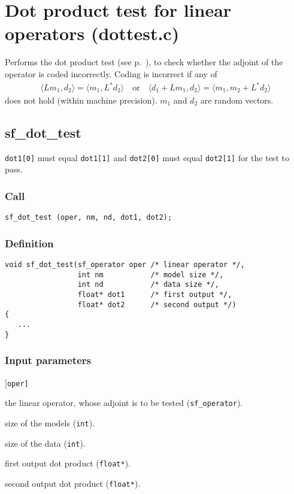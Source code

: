 \section{Dot product test for linear operators (dottest.c)}
Performs the dot product test (see p.~\pageref{sec:dot-product test}), to check whether the adjoint of the operator is coded incorrectly. Coding is incorrect if any of 
\begin{gather*}
   \langle Lm_1,d_2\rangle = \langle m_1, L^*d_2\rangle\quad\textrm{or}\quad
   \langle d_1 + Lm_1,d_2\rangle = \langle m_1, m_2+L^*d_2\rangle
\end{gather*} 
does not hold (within machine precision). $m_1$ and $d_2$ are random vectors.




\subsection{{sf\_dot\_test}}\label{sec:sf_dot_test}
\texttt{dot1[0]} must equal \texttt{dot1[1]} and \texttt{dot2[0]} must equal \texttt{dot2[1]} for the test to pass.

\subsubsection*{Call}
\begin{verbatim}sf_dot_test (oper, nm, nd, dot1, dot2);\end{verbatim}

\subsubsection*{Definition}
\begin{verbatim}
void sf_dot_test(sf_operator oper /* linear operator */, 
                 int nm           /* model size */, 
                 int nd           /* data size */, 
                 float* dot1      /* first output */, 
                 float* dot2      /* second output */) 
{
   ...
}
\end{verbatim}

\subsubsection*{Input parameters}
\begin{desclist}{\tt }{\quad}[\tt oper]
   \setlength\itemsep{0pt}
   \item[oper] the linear operator, whose adjoint is to be tested (\texttt{sf\_operator}). 
   \item[nm]   size of the models (\texttt{int}). 
   \item[nd]   size of the data (\texttt{int}). 
   \item[dot1] first output dot product (\texttt{float*}).
   \item[dot2] second output dot product (\texttt{float*}).
\end{desclist}




